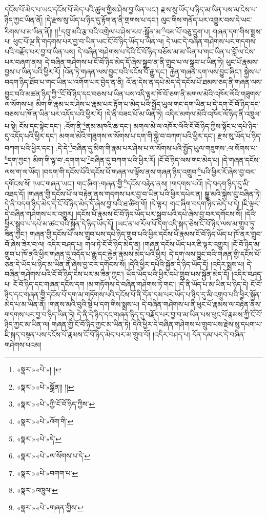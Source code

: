 དངོས་པོ་མེད་པ་ཡང་དངོས་པོ་མེད་པའི་ཚུལ་གྱིས་ཤེས་བྱ་ཡིན་ཡང་། རྫས་སུ་ཡོད་པ་ཉིད་མ་ཡིན་པས་མ་ངེས་པ་ཉིད་ཀྱང་ཡིན་ནོ། །དེ་རྫས་སུ་ཡོད་པ་ཉིད་དུ་རྟོག་ན་ནི་གྲགས་པ་དང་། ལུང་གིས་གནོད་པར་འགྱུར་བས་དེ་ཡང་རིགས་པ་མ་ཡིན་ནོ།། །།\footnote{«སྣར་»«པེ་»། །}དབུ་མའི་རྩ་བའི་འགྲེལ་པ་ཤེས་རབ་:སྒྲོན་མ་\footnote{«སྣར་»«པེ་»སྒྲོན།། །།}བམ་པོ་བཅུ་དྲུག་པ། གཞན་དག་གིས་སྨྲས་པ། ཕུང་པོ་ལྔ་ནི་གདགས་པར་བྱ་བ་ཡིན་ཡང་ངོ་བོ་ཉིད་ཡོད་པ་ཡིན་ལ། དེ་ཡང་དེ་བཞིན་གཤེགས་པར་གདགས་པའི་བརྗོད་པར་བྱ་བ་ཡིན་པས། དེ་བཞིན་གཤེགས་པ་དེའི་ངོ་བོ་ཉིད་བཅོས་མ་མ་ཡིན་པ་གང་ཡིན་པ་བློ་ལ་ངེས་པར་བཞག་ནས། དེ་བཞིན་གཤེགས་པ་ངོ་བོ་ཉིད་མེད་དོ་ཞེས་སྒྲུབ་ན་ནི་གྲུབ་པ་ལ་སྒྲུབ་པ་ཡིན་ཏེ། ཕུང་པོ་རྣམས་བྱས་པ་ཡིན་པའི་ཕྱིར་རོ། །འོན་ཏེ་གཞན་ལས་བྱུང་བའི་དངོས་པོ་རྒྱུ་དང་། རྐྱེན་གཞན་དག་ལས་བྱུང་ཞིང་། སྐྱེས་པ་བདག་ཉིད་ཐོབ་པ་གང་ཡིན་པ་འགོག་པར་བྱེད་ན་ནི། འོ་ན་དེས་ན་དཔེ་མེད་དེ་དངོས་པོ་ཐམས་ཅད་ནི་གཞན་ལས་བྱུང་བའི་མཚན་ཉིད་ཀྱི་\footnote{«སྣར་»«པེ་»ཀྱི་ངོ་བོ་ཉིད་ཀྱིས་}ངོ་བོ་ཉིད་དང་བཅས་པ་ཡིན་པས་འདི་ལྟར་ཁོ་བོ་ཅག་ནི་མགལ་མེའི་འཁོར་ལོའི་གཟུགས་ལ་སོགས་པ། མིག་གི་རྣམ་པར་ཤེས་པ་རྣམ་པར་རྟོག་པ་མེད་པའི་སྤྱོད་ཡུལ་གང་དག་ཡིན་པ་དེ་དག་ངོ་བོ་ཉིད་དང་བཅས་པ་ཁོ་ན་ཡིན་པར་འདོད་པའི་ཕྱིར་རོ། །དེ་ནི་བཟང་པོ་མ་ཡིན་ཏེ། འདིར་མགལ་མེའི་འཁོར་ལོ་ཉིད་ནི་འཁྲུལ་པ་སྟེ། ངོས་དང་སྟེང་དང་། :འོག་ནི་\footnote{«སྣར་»«པེ་»འོག་གི་}ནམ་མཁའི་ཆ་དང་། མགལ་མེ་ལ་འཁོར་ལོའི་ངོ་བོ་ཉིད་ཀྱིས་སྟོང་པ་དཔེ་ཉིད་དུ་འདོད་པའི་ཕྱིར་དང་། མགལ་མེའི་གཟུགས་ལ་སོགས་པ་དག་གི་སྐྱེ་བ་བཀག་པའི་ཕྱིར་དང་། རྫས་སུ་ཡོད་པ་ཉིད་བཀག་པའི་ཕྱིར་དང་། :དེ་དེ་\footnote{«སྣར་»«པེ་»དེ་}བཞིན་དུ་མིག་གི་རྣམ་པར་ཤེས་པ་ལ་སོགས་པའི་སྤྱོད་ཡུལ་གཟུགས་:ལ་སོགས་པ་\footnote{«སྣར་»«པེ་»ལ་སོགས་པ་དེ་}དག་ཀྱང་། མིག་གི་ལྟ་བ་:དགག་པ་\footnote{«སྣར་»«པེ་»བགག་པ་}བཞིན་དུ་བཀག་པའི་ཕྱིར་རོ། །ངོ་བོ་ཉིད་ལས་གང་མེད་པ། །དེ་གཞན་དངོས་ལས་ག་ལ་ཡོད། །བདག་གི་དངོས་པོའི་དངོས་པོ་གཞན་ལ་ལྟོས་ནས་གཞན་ཉིད་འགྲུབ་\footnote{«སྣར་»འཁྲུལ་}པའི་ཕྱིར་རོ་ཞེས་བྱ་བར་དགོངས་སོ། །ཡང་གཞན་ཡང་། གང་ཞིག་:གཞན་གྱི་\footnote{«སྣར་»«པེ་»གཞན་གྱིས་}དངོས་བརྟེན་ནས། །གདགས་པའོ། །དེ་བདག་ཉིད་དུ་མི་འཐད་དོ། །གཞན་གྱི་དངོས་པོ་ལ་བརྟེན་ནས་གདགས་པར་བྱ་བ་ཡིན་པའི་ཕྱིར་དཔེར་ན། སྒྱུ་མའི་སྐྱེས་བུ་བཞིན་ཏེ། དེ་ནི་བདག་ཉིད་མེད་དེ་ངོ་བོ་ཉིད་མེད་དོ་ཞེས་བྱ་བའི་ཐ་ཚིག་གོ། །དེ་ལྟར། གང་ཞིག་བདག་ཉིད་མེད་པ་དེ། །ཇི་ལྟར་དེ་བཞིན་གཤེགས་པར་འགྱུར། །དངོས་པོ་རྣམས་ངོ་བོ་ཉིད་ཡོད་པར་སྒྲུབ་པའི་དཔེ་ཞེས་བྱ་བར་དགོངས་སོ། །དེའི་ཕྱིར་སྒྲུབ་པ་དཔེ་མ་ཚང་བའི་སྐྱོན་དེ་ཉིད་ཡོད་དོ། །ཡང་ན་ཕ་རོལ་པོ་དག་འདི་སྐད་ཅེས་ངོ་བོ་ཉིད་ལས་མ་གྲུབ་ཏུ་ཟིན་ཀྱང་། གཞན་གྱི་དངོས་པོ་ལས་གྲུབ་པས་དཔེ་ཉིད་གྲུབ་པའི་ཕྱིར་དངོས་པོ་རྣམས་ངོ་བོ་ཉིད་ཡོད་པ་ཁོ་ནར་གྲུབ་བོ་ཞེས་ཟེར་བ་ལ། འདིར་བཤད་པ། གལ་ཏེ་ངོ་བོ་ཉིད་མེད་ན། །གཞན་དངོས་ཡོད་པར་ཇི་ལྟར་འགྱུར། །ངོ་བོ་ཉིད་མ་གྲུབ་པ་ཁོ་ནའི་ཕྱིར་གཞན་དུ་འདོད་པ་རྒྱུ་དང་རྐྱེན་རྣམས་མེད་པའི་ཕྱིར། དེ་དག་ལས་བྱུང་བའི་གཞན་གྱི་དངོས་པོ་ཅན་དེ་ཡོད་པ་ཉིད་མ་ཡིན་ནོ་ཞེས་བྱ་བར་དགོངས་སོ། །དེའི་ཕྱིར་དཔེའི་སྐྱོན་དེ་ཉིད་ཡོད་དོ། །འདིར་སྨྲས་པ། དེ་བཞིན་གཤེགས་པའི་ངོ་བོ་ཉིད་ངེས་པར་མ་ཟིན་ཀྱང་། ཡོད་ཡོད་པའི་ཕྱིར་དཔེ་གྲུབ་པས་སྐྱོན་མེད་དོ། །འདིར་བཤད་པ། ངོ་བོ་ཉིད་དང་གཞན་དངོས་དག །མ་གཏོགས་དེ་བཞིན་གཤེགས་ཏེ་གང་། །དེ་ནི་ཡོད་པ་མ་ཡིན་པ་ཉིད་དེ། ངོ་བོ་ཉིད་དང་གཞན་གྱི་དངོས་པོ་དག་མ་གཏོགས་པའི་དངོས་པོ་ནི་དོན་དམ་པར་ཡོད་པ་ཉིད་དུ་མི་འགྲུབ་པའི་ཕྱིར་སྐྱོན་མེད་པ་མ་ཡིན་ནོ། །གནས་མའི་བུའི་སྡེ་པ་དག་གིས་སྨྲས་པ། དེ་བཞིན་གཤེགས་པ་ནི་ཕུང་པོ་རྣམས་ལ་བརྟེན་ནས་གདགས་པར་བྱ་བ་ཉིད་ཡིན་ཏེ། དེ་ནི་དེ་ཉིད་དང་གཞན་ཉིད་དུ་བརྗོད་པར་བྱ་བ་མ་ཡིན་པས་ཕུང་པོ་རྣམས་ཀྱི་ངོ་བོ་ཉིད་ཀྱང་མ་ཡིན་ལ། གཞན་གྱི་ངོ་བོ་ཉིད་ཀྱང་མ་ཡིན་ཏེ། དེའི་ཕྱིར་དེ་བཞིན་གཤེགས་པ་གྲུབ་པས་རྗེས་སུ་དཔག་པ་ཇི་སྐད་བསྟན་པས་དངོས་པོ་རྣམས་ངོ་བོ་ཉིད་མེད་པར་མ་གྲུབ་བོ། །འདིར་བཤད་པ། དོན་དམ་པར་དེ་བཞིན་གཤེགས་པའམ། 